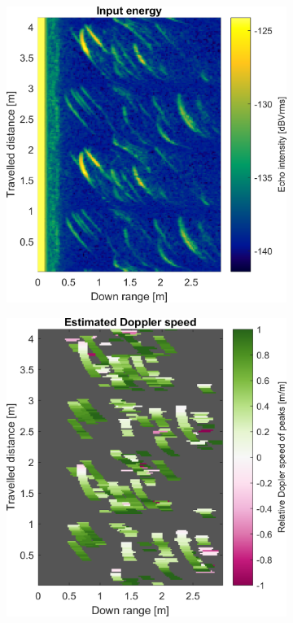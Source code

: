 \begin{figure}[htbp]
    \centering
    \begin{subfigure}[t]{0.475\linewidth}
        \centering
        \includegraphics[width=\linewidth,max height=.475\textheight]{gfx/results/dungeon_input.png}
    \end{subfigure}%
    \hfill%
    \begin{subfigure}[t]{0.475\linewidth}  
        \centering 
        \includegraphics[width=\linewidth,max height=.475\textheight]{gfx/results/dungeon_doppler.png}

\end{subfigure}
\end{figure}
